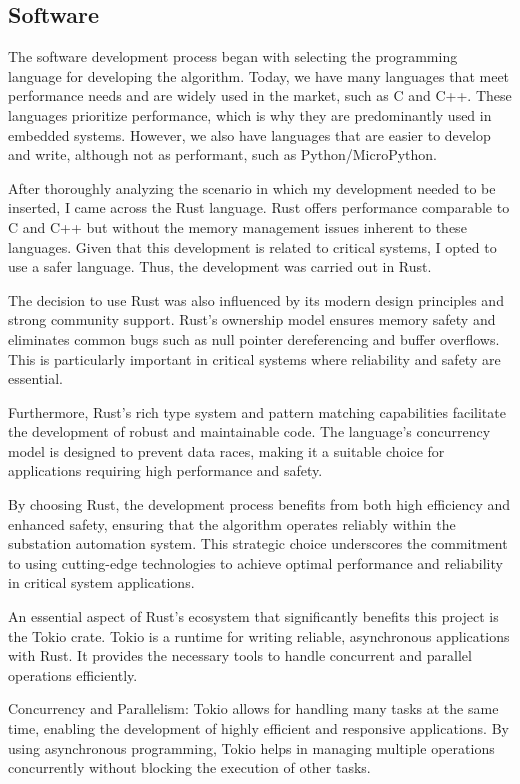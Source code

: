 \subsection{Software}

The software development process began with selecting the programming language for developing the algorithm. Today, we have many languages that meet performance needs and are widely used in the market, such as C and C++. These languages prioritize performance, which is why they are predominantly used in embedded systems. However, we also have languages that are easier to develop and write, although not as performant, such as Python/MicroPython.

After thoroughly analyzing the scenario in which my development needed to be inserted, I came across the Rust language. Rust offers performance comparable to C and C++ but without the memory management issues inherent to these languages. Given that this development is related to critical systems, I opted to use a safer language. Thus, the development was carried out in Rust.

The decision to use Rust was also influenced by its modern design principles and strong community support. Rust’s ownership model ensures memory safety and eliminates common bugs such as null pointer dereferencing and buffer overflows. This is particularly important in critical systems where reliability and safety are essential.

Furthermore, Rust's rich type system and pattern matching capabilities facilitate the development of robust and maintainable code. The language's concurrency model is designed to prevent data races, making it a suitable choice for applications requiring high performance and safety.

By choosing Rust, the development process benefits from both high efficiency and enhanced safety, ensuring that the algorithm operates reliably within the substation automation system. This strategic choice underscores the commitment to using cutting-edge technologies to achieve optimal performance and reliability in critical system applications.

An essential aspect of Rust's ecosystem that significantly benefits this project is the Tokio crate. Tokio is a runtime for writing reliable, asynchronous applications with Rust. It provides the necessary tools to handle concurrent and parallel operations efficiently.

Concurrency and Parallelism: Tokio allows for handling many tasks at the same time, enabling the development of highly efficient and responsive applications. By using asynchronous programming, Tokio helps in managing multiple operations concurrently without blocking the execution of other tasks.


